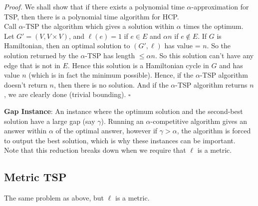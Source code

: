 \documentclass[a4paper]{article}
\newenvironment{proof}{\begin{breakbox}\textit{Proof.}}{\hfill$\square$\end{breakbox}}
\newcommand{\nl}{\vspace{0.2cm}\\}
\begin{document}
\begin{proof}
    We shall show that if there exists a polynomial time $\alpha$-approximation for TSP, then there is a polynomial time algorithm for HCP.\nl
    Call $\alpha$-TSP the algorithm which gives a solution within $\alpha$ times the optimum.\nl
    Let $G' = (V, V \times V)$, and $\ell(e) = 1$ if $e \in E$ and $\alpha n$ if $e \not\in E$. If $G$ is Hamiltonian, then an optimal solution to $(G', \ell)$ has value = $n$. So the solution
    returned by the $\alpha$-TSP has length $\le \alpha n$. So this solution can't have any edge that is not in $E$. Hence this solution is a Hamiltonian cycle in $G$ and has value $n$ (which is in
    fact the minimum possible).
    Hence, if the $\alpha$-TSP algorithm doesn't return $n$, then there is no solution.
    And if the $\alpha$-TSP algorithm returns $n$, we are clearly done (trivial bounding).
\end{proof}

\textbf{Gap Instance}: An instance where the optimum solution and the second-best solution have a large gap (say $\gamma$). Running an $\alpha$-competitive algorithm gives an answer within
$\alpha$ of the optimal answer, however if $\gamma > \alpha$, the algorithm is forced to output the best solution, which is why these instances can be important.\nl

Note that this reduction breaks down when we require that $\ell$ is a metric.

\subsection{Metric TSP}

The same problem as above, but $\ell$ is a metric.
\end{document}
